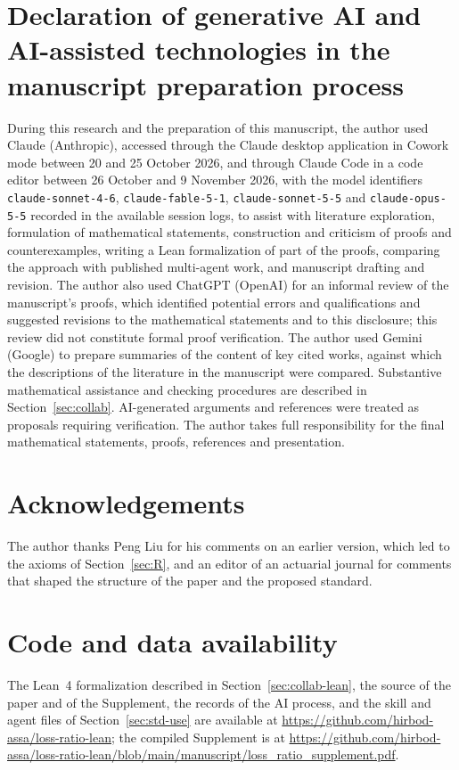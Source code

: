 \section*{Declaration of generative AI and AI-assisted technologies in the manuscript preparation process}

During this research and the preparation of this manuscript, the author used Claude (Anthropic), accessed through
the Claude desktop application in Cowork mode between 20 and 25 October 2026, and through Claude Code in a code
editor between 26 October and 9 November 2026, with the model identifiers
\texttt{claude-sonnet-4-6}, \texttt{claude-fable-5-1}, \texttt{claude-sonnet-5-5} and \texttt{claude-opus-5-5}
recorded in the available session logs, to assist with literature exploration, formulation of mathematical
statements, construction and criticism of proofs and counterexamples, writing a Lean formalization of part of the
proofs, comparing the approach with published multi-agent work, and manuscript drafting and revision. The author also used ChatGPT (OpenAI) for an informal review of the
manuscript's proofs, which identified potential errors and qualifications and suggested revisions to the
mathematical statements and to this disclosure; this review did not constitute formal proof verification. The author used Gemini (Google) to prepare summaries of the
content of key cited works, against which the descriptions of the literature in the manuscript were compared.
Substantive mathematical assistance and checking procedures are described in Section~\ref{sec:collab}.
AI-generated arguments and references were treated as proposals requiring verification. The author takes full
responsibility for the final mathematical statements, proofs, references and presentation.

\section*{Acknowledgements}
The author thanks Peng Liu for his comments on an earlier version, which led to the axioms of
Section~\ref{sec:R}, and an editor of an actuarial journal for comments that shaped the structure of the paper and
the proposed standard.

\section*{Code and data availability}
The Lean~4 formalization described in Section~\ref{sec:collab-lean}, the source of the paper and of the
Supplement, the records of the AI process, and the skill and agent files of Section~\ref{sec:std-use} are available at
\url{https://github.com/hirbod-assa/loss-ratio-lean}; the compiled Supplement is at
\url{https://github.com/hirbod-assa/loss-ratio-lean/blob/main/manuscript/loss_ratio_supplement.pdf}.

